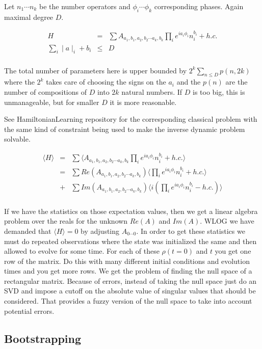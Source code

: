 \documentclass[11pt]{article}
\theoremstyle{change}
\theoremstyle{nonumberplain}
\numberwithin{equation}{section}
\newcommand\abs[1]{ \mid #1 \mid }
\begin{document}
Let $n_1 \cdots n_k$ be the number operators and $\phi_i \cdots \phi_k$ corresponding phases. Again maximal degree $D$.

\begin{eqnarray*}
H &=& \sum A_{a_1,b_1,a_2,b_2 \cdots a_k , b_k} \prod_i e^{i a_i \phi_i} n_i^{b_i} + h.c.\\
\sum_i \abs{a}_i + b_i &\leq& D\\
\end{eqnarray*}

The total number of parameters here is upper bounded by $2^{k} \sum_{n \leq D} p(n,2k)$ where the $2^k$ takes care of choosing the signs on the $a_i$ and the $p(n)$ are the number of compositions of $D$ into $2k$ natural numbers. If $D$ is too big, this is unmanageable, but for smaller $D$ it is more reasonable.

See HamiltonianLearning repository for the corresponding classical problem with the same kind of constraint being used to make the inverse dynamic problem solvable.

\begin{eqnarray*}
\langle H \rangle &=& \sum \langle A_{a_1,b_1,a_2,b_2 \cdots a_k , b_k} \prod_i e^{i a_i \phi_i} n_i^{b_i} + h.c. \rangle\\
&=& \sum Re(A_{a_1,b_1,a_2,b_2 \cdots a_k , b_k}) \langle \prod_i e^{i a_i \phi_i} n_i^{b_i} + h.c. \rangle\\
&+& \sum Im(A_{a_1,b_1,a_2,b_2 \cdots a_k , b_k}) \langle i( \prod_i e^{i a_i \phi_i} n_i^{b_i} - h.c.) \rangle\\
\end{eqnarray*}

If we have the statistics on those expectation values, then we get a linear algebra problem over the reals for the unknown $Re(A)$ and $Im(A)$. WLOG we have demanded that $\langle H \rangle = 0$ by adjusting $A_{0 \cdots 0}$. In order to get these statistics we must do repeated observations where the state was initialized the same and then allowed to evolve for some time. For each of these $\rho(t=0)$ and $t$ you get one row of the matrix. Do this with many different initial conditions and evolution times and you get more rows. We get the problem of finding the null space of a rectangular matrix. Because of errors, instead of taking the null space just do an SVD and impose a cutoff on the absolute value of singular values that should be considered. That provides a fuzzy version of the null space to take into account potential errors. 

\subsection{Bootstrapping}
\end{document}
